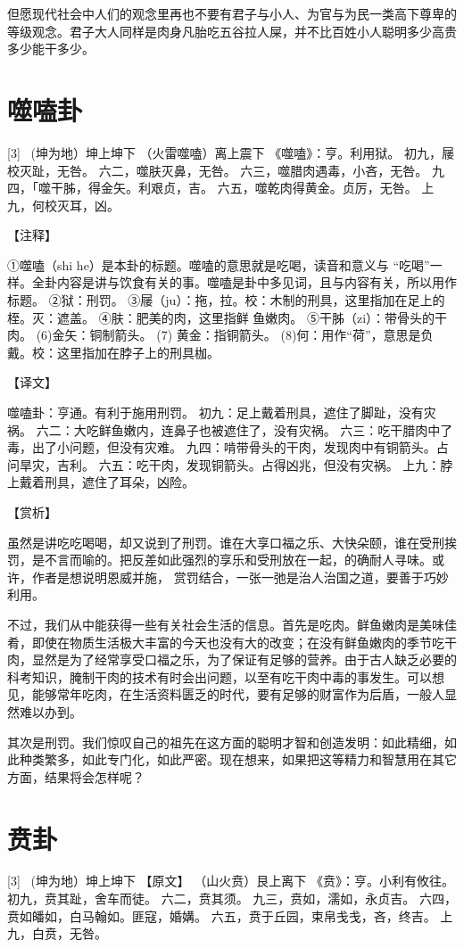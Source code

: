\documentclass[12pt,UTF8]{ctexbook}
\begin{document}
但愿现代社会中人们的观念里再也不要有君子与小人、为官与为民一类高下尊卑的等级观念。君子大人同样是肉身凡胎吃五谷拉人屎，并不比百姓小人聪明多少高贵多少能干多少。

\chapter{噬嗑卦}
[3] \ (坤为地）坤上坤下
（火雷噬嗑）离上震下
《噬嗑》：亨。利用狱。
初九，屦校灭趾，无咎。
六二，噬肤灭鼻，无咎。
六三，噬腊肉遇毒，小吝，无咎。
九四，「噬干胏，得金矢。利艰贞，吉。
六五，噬乾肉得黄金。贞厉，无咎。
上九，何校灭耳，凶。

【注释】

①噬嗑（shi he）是本卦的标题。噬嗑的意思就是吃喝，读音和意义与 “吃喝”一样。全卦内容是讲与饮食有关的事。噬嗑是卦中多见词，且与内容有关，所以用作标题。
②狱：刑罚。
③屦（ju）：拖，拉。校：木制的刑具，这里指加在足上的桎。灭：遮盖。
④肤：肥美的肉，这里指鲜 鱼嫩肉。
⑤干胏（zi）：带骨头的干肉。
(6)金矢：铜制箭头。
(7) 黄金：指铜箭头。
(8)何：用作“荷”，意思是负戴。校：这里指加在脖子上的刑具枷。

【译文】

噬嗑卦：亨通。有利于施用刑罚。
初九：足上戴着刑具，遮住了脚趾，没有灾祸。
六二：大吃鲜鱼嫩内，连鼻子也被遮住了，没有灾祸。
六三：吃干腊肉中了毒，出了小问题，但没有灾难。
九四：啃带骨头的干肉，发现肉中有铜箭头。占问旱灾，吉利。
六五：吃干肉，发现铜箭头。占得凶兆，但没有灾祸。
上九：脖上戴着刑具，遮住了耳朵，凶险。

【赏析】

虽然是讲吃吃喝喝，却又说到了刑罚。谁在大享口福之乐、大快朵颐，谁在受刑挨罚，是不言而喻的。把反差如此强烈的享乐和受刑放在一起，的确耐人寻味。或许，作者是想说明恩威并施， 赏罚结合，一张一弛是治人治国之道，要善于巧妙利用。

不过，我们从中能获得一些有关社会生活的信息。首先是吃肉。鲜鱼嫩肉是美味佳肴，即使在物质生活极大丰富的今天也没有大的改变；在没有鲜鱼嫩肉的季节吃干肉，显然是为了经常享受口福之乐，为了保证有足够的营养。由于古人缺乏必要的科考知识，腌制干肉的技术有时会出问题，以至有吃干肉中毒的事发生。可以想见，能够常年吃肉，在生活资料匮乏的时代，要有足够的财富作为后盾，一般人显然难以办到。

其次是刑罚。我们惊叹自己的祖先在这方面的聪明才智和创造发明：如此精细，如此种类繁多，如此专门化，如此严密。现在想来，如果把这等精力和智慧用在其它方面，结果将会怎样呢？

\chapter{贲卦}
[3] \ (坤为地）坤上坤下
【原文】
（山火贲）艮上离下
《贲》：亨。小利有攸往。
初九，贲其趾，舍车而徒。
六二，贲其须。
九三，贲如，濡如，永贞吉。
六四，贲如皤如，白马翰如。匪寇，婚媾。
六五，贲于丘园，束帛戋戋，吝，终吉。
上九，白贲，无咎。
\end{document}
